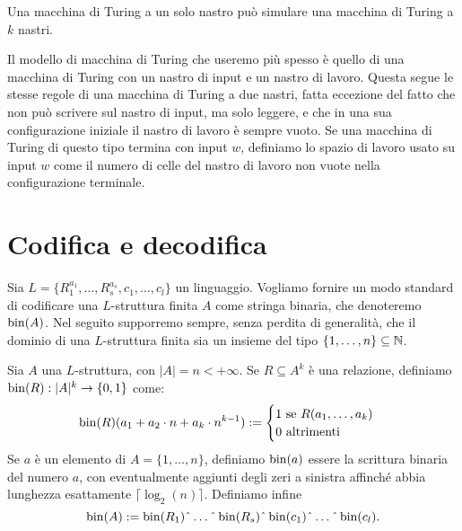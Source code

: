 \begin{fatto}
Una macchina di Turing a un solo nastro può simulare una macchina di Turing
a $k$ nastri.
\end{fatto}

Il modello di macchina di Turing che useremo più spesso è quello di una macchina di Turing
con un nastro di input e un nastro di lavoro. Questa segue le stesse regole di
una macchina di Turing a due nastri, fatta eccezione del fatto che non può scrivere
sul nastro di input, ma solo leggere, e che in una sua configurazione iniziale
il nastro di lavoro è sempre vuoto. Se una macchina di Turing di questo tipo
termina con input $w$, definiamo lo spazio di lavoro usato su input $w$
come il numero di celle del nastro di lavoro non vuote nella configurazione terminale.


\section{Codifica e decodifica}
Sia $L=\{R^{a_1}_1, \ldots, R^{a_s}_s, c_1, \ldots, c_l\}$ un linguaggio.
Vogliamo fornire un modo standard di codificare una $L$-struttura finita $A$ come
stringa binaria, che denoteremo $\operatorname{bin}(A)$. Nel seguito supporremo sempre, senza
perdita di generalità, che
il dominio di una $L$-struttura finita sia un insieme del tipo
$\{1,\ldots,n\} \subseteq \mathbb{N}$.

\begin{definizione}
  Sia $A$ una $L$-struttura, con $|A| = n < +\infty$.
  Se $R \subseteq A^k$ è una relazione,
  definiamo $\operatorname{bin}(R): |A|^k \to \{0,1\}$ come:
  \[\operatorname{bin}(R)(a_1 + a_2 \cdot n + a_k \cdot n^{k-1}):=
    \begin{cases}
      1 \mbox{ se } R(a_1,\ldots,a_k) \\
      0 \mbox{ altrimenti}
    \end{cases}
  \]
  Se $a$ è un elemento di $A=\{1,\ldots,n\}$, definiamo $\operatorname{bin}(a)$ essere la
  scrittura binaria del numero $a$, con eventualmente aggiunti degli zeri a
  sinistra affinché abbia lunghezza esattamente $\lceil \log_2(n) \rceil$.
  Definiamo infine
  \[\bin(A):=\bin(R_1)\string^\ldots\string^\bin(R_s)\string^\bin(c_1)\string^\ldots\string^\bin(c_l).\]
\end{definizione}

